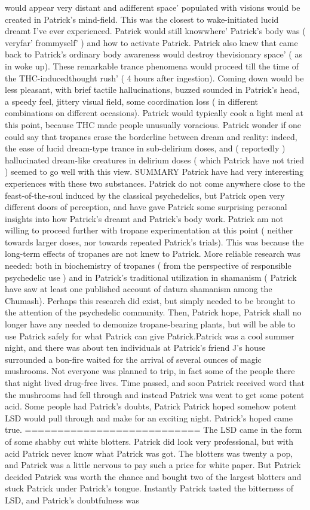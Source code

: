 \documentclass[12pt]{book}
\begin{document}
would appear very distant and adifferent space' populated with visions would be created in Patrick's mind-field. This was the closest to wake-initiated lucid dreamt I've ever experienced. Patrick would still knowwhere' Patrick's body was ( veryfar' frommyself' ) and how to activate Patrick. Patrick also knew that came back to Patrick's ordinary body awareness would destroy thevisionary space' ( as in woke up). These remarkable trance phenomena would proceed till the time of the THC-inducedthought rush' ( 4 hours after ingestion). Coming down would be less pleasant, with brief tactile hallucinations, buzzed sounded in Patrick's head, a speedy feel, jittery visual field, some coordination loss ( in different combinations on different occasions). Patrick would typically cook a light meal at this point, because THC made people unusually voracious. Patrick wonder if one could say that tropanes erase the borderline between dream and reality: indeed, the ease of lucid dream-type trance in sub-delirium doses, and ( reportedly ) hallucinated dream-like creatures in delirium doses ( which Patrick have not tried ) seemed to go well with this view. SUMMARY Patrick have had very interesting experiences with these two substances. Patrick do not come anywhere close to the feast-of-the-soul induced by the classical psychedelics, but Patrick open very different doors of perception, and have gave Patrick some surprising personal insights into how Patrick's dreamt and Patrick's body work. Patrick am not willing to proceed further with tropane experimentation at this point ( neither towards larger doses, nor towards repeated Patrick's trials). This was because the long-term effects of tropanes are not knew to Patrick. More reliable research was needed: both in biochemistry of tropanes ( from the perspective of responsible psychedelic use ) and in Patrick's traditional utilization in shamanism ( Patrick have saw at least one published account of datura shamanism among the Chumash). Perhaps this research did exist, but simply needed to be brought to the attention of the psychedelic community. Then, Patrick hope, Patrick shall no longer have any needed to demonize tropane-bearing plants, but will be able to use Patrick safely for what Patrick can give Patrick.Patrick was a cool summer night, and there was about ten individuals at Patrick's friend J's house surrounded a bon-fire waited for the arrival of several ounces of magic mushrooms. Not everyone was planned to trip, in fact some of the people there that night lived drug-free lives. Time passed, and soon Patrick received word that the mushrooms had fell through and instead Patrick was went to get some potent acid. Some people had Patrick's doubts, Patrick Patrick hoped somehow potent LSD would pull through and make for an exciting night. Patrick's hoped came true. =========================== The LSD came in the form of some shabby cut white blotters. Patrick did look very professional, but with acid Patrick never know what Patrick was got. The blotters was twenty a pop, and Patrick was a little nervous to pay such a price for white paper. But Patrick decided Patrick was worth the chance and bought two of the largest blotters and stuck Patrick under Patrick's tongue. Instantly Patrick tasted the bitterness of LSD, and Patrick's doubtfulness was 
\end{document}
